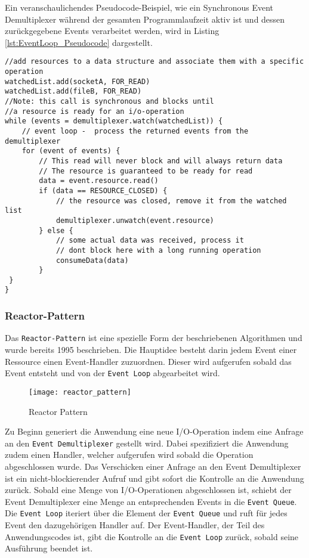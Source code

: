 Ein veranschaulichendes Pseudocode-Beispiel, wie ein Synchronous Event Demultiplexer während der
gesamten Programmlaufzeit aktiv ist und dessen zurückgegebene Events verarbeitet werden,
wird in Listing \ref{lst:EventLoop_Pseudocode} dargestellt.
\begin{lstlisting}[caption=Einfaches Pseudocode-Beispiel für Synchronous Event Demultiplexing mit Event Loop),
captionpos=b, label=lst:EventLoop_Pseudocode]
//add resources to a data structure and associate them with a specific operation
watchedList.add(socketA, FOR_READ)                            
watchedList.add(fileB, FOR_READ)
//Note: this call is synchronous and blocks until
//a resource is ready for an i/o-operation
while (events = demultiplexer.watch(watchedList)) {
	// event loop -  process the returned events from the demultiplexer
	for (event of events) {
		// This read will never block and will always return data
		// The resource is guaranteed to be ready for read
		data = event.resource.read()
		if (data == RESOURCE_CLOSED) {
			// the resource was closed, remove it from the watched list
			demultiplexer.unwatch(event.resource)
		} else {
			// some actual data was received, process it 
			// dont block here with a long running operation
			consumeData(data)
		}
 }
}
\end{lstlisting}\parencite[Event Demultiplexing]{NodeJSDesignPatterns}
\newpage
\subsubsection{Reactor-Pattern}
\label{subsubsec:reactor_pattern}
Das \verb|Reactor-Pattern| ist eine spezielle Form der beschriebenen Algorithmen und wurde bereits 1995 beschrieben.\parencite{SchmidtReactorPattern}
Die Hauptidee besteht darin jedem Event einer Ressource einen Event-Handler zuzuordnen.
Dieser wird aufgerufen sobald das Event entsteht und von der \verb|Event Loop| abgearbeitet wird.

\begin{figure}[H]
  \centering
  \texttt{[image: reactor\_pattern]}
  \caption{Reactor Pattern \parencite[Abbildung 1.3]{NodeJSDesignPatterns}}
  \label{fig:reactor_pattern}
\end{figure}

Zu Beginn generiert die Anwendung eine neue I/O-Operation indem eine Anfrage an den \verb|Event Demultiplexer| gestellt wird.
Dabei spezifiziert die Anwendung zudem einen Handler, welcher aufgerufen wird sobald die Operation abgeschlossen wurde.
Das Verschicken einer Anfrage an den Event Demultiplexer ist ein nicht-blockierender Aufruf und gibt sofort die Kontrolle
an die Anwendung zurück.
Sobald eine Menge von I/O-Operationen abgeschlossen ist, schiebt der Event Demultiplexer eine Menge an entsprechenden Events
in die \verb|Event Queue|.
Die \verb|Event Loop| iteriert über die Element der \verb|Event Queue| und ruft für jedes Event den dazugehörigen Handler auf.
Der Event-Handler, der Teil des Anwendungscodes ist, gibt die Kontrolle an die \verb|Event Loop| zurück, sobald seine Ausführung
beendet ist.


